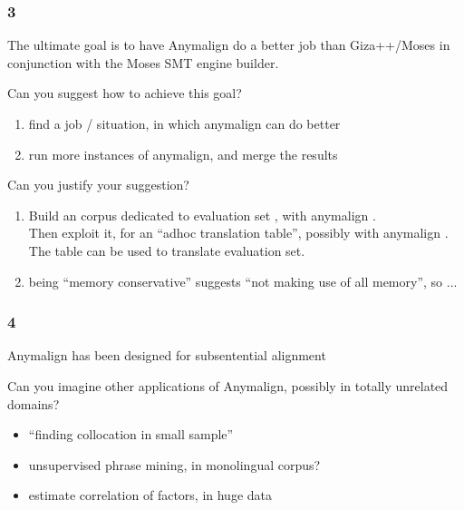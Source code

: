     \begin{frame}\frametitle{3}

    \begin{block}{The ultimate goal is to have Anymalign do a better job
      than Giza++/Moses in conjunction with the Moses SMT engine builder.}

      \end{block}

      \begin{block}{Can you suggest how to achieve this goal?}

      \begin{enumerate} \itemsep1pt\parskip0pt
      \item
      find a job / situation, in which anymalign can do better
      \item
      run more instances of anymalign, and merge the results
      \end{enumerate}

      \end{block}

      \begin{block}{Can you justify your suggestion?}

      \begin{enumerate} \itemsep1pt\parskip0pt
      \item
      Build an corpus dedicated to evaluation set , with anymalign .
      \\ Then exploit it, for an ``adhoc translation table'',  possibly with anymalign .
      \\ The table can be used to translate evaluation set.
      \item
        being ``memory conservative'' suggests ``not making use of all memory'', so ...
      \end{enumerate}

      \end{block}

      \end{frame}

      \begin{frame}\frametitle{4}

      \begin{block}{
        Anymalign has been designed for subsentential alignment
      }
\end{block}

\begin{block}{
  Can you imagine other applications of Anymalign, possibly in totally
    unrelated domains?}{
    \begin{itemize} \itemsep1pt\parskip0pt
    \item
    ``finding collocation in small sample''
    \item
    unsupervised phrase mining, in monolingual corpus?
    \item
    estimate correlation of factors, in huge data
    \end{itemize}
}
\end{block}



\end{frame}
